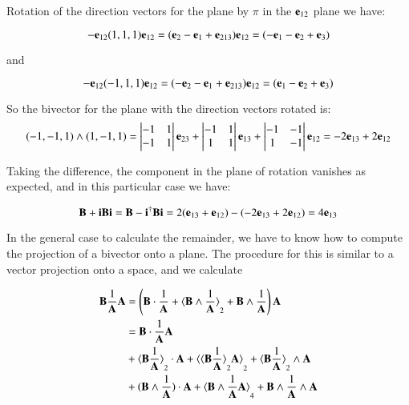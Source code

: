 \documentclass{article}      %
\begin{document}
Rotation of the direction vectors for the plane by $\pi$ in the $\mathbf{e}_{12}$ plane we have:

\[
-\mathbf{e}_{12}(1,1,1)\mathbf{e}_{12}= 
(\mathbf{e}_{2}
-\mathbf{e}_{1}
+\mathbf{e}_{213})\mathbf{e}_{12}
= (-\mathbf{e}_{1} -\mathbf{e}_{2} + \mathbf{e}_{3})
\]

and

\[
-\mathbf{e}_{12}(-1,1,1)\mathbf{e}_{12}= 
(-\mathbf{e}_{2}
-\mathbf{e}_{1}
+\mathbf{e}_{213})\mathbf{e}_{12}
= (\mathbf{e}_{1} -\mathbf{e}_{2} + \mathbf{e}_{3})
\]

So the bivector for the plane with the direction vectors rotated is:
\[
(-1,-1,1)\wedge(1,-1,1) = 
\begin{vmatrix}
 -1 & 1 \\
 -1 & 1 \\
\end{vmatrix}
\mathbf{e}_{23}
+
\begin{vmatrix}
 -1 & 1 \\
 1 & 1 \\
\end{vmatrix}
\mathbf{e}_{13}
+
\begin{vmatrix}
 -1 & -1 \\
 1 & -1 \\
\end{vmatrix}
\mathbf{e}_{12}
=
-2\mathbf{e}_{13} + 2\mathbf{e}_{12}
\]

Taking the difference, the component in the plane of rotation vanishes as expected, and in this particular case we have:

\[
\mathbf{B} + \mathbf{i}\mathbf{B}\mathbf{i} = \mathbf{B} - \mathbf{i}^\dagger\mathbf{B}\mathbf{i} = 
2(\mathbf{e}_{13} + \mathbf{e}_{12}) -(-2\mathbf{e}_{13} + 2\mathbf{e}_{12}) = 4\mathbf{e}_{13}
\]

In the general case to calculate the remainder, we have to know how to compute the projection of a bivector onto a plane.  The procedure for this is similar to a vector
projection onto a space, and we calculate

\begin{align*}
\mathbf{B}\frac{1}{\mathbf{A}}\mathbf{A} 
&= \left(\mathbf{B} \cdot \frac{1}{\mathbf{A}} +{\langle{\mathbf{B}\wedge \frac{1}{\mathbf{A}}}\rangle}_2 +\mathbf{B} \wedge \frac{1}{\mathbf{A}}\right) \mathbf{A} \\
&= 
\mathbf{B} \cdot \frac{1}{\mathbf{A}} \mathbf{A} \\
&+{\langle{ {\mathbf{B}\frac{1}{\mathbf{A}}}\rangle}_2} \cdot \mathbf{A} 
+{\langle{{\langle{ {\mathbf{B}\frac{1}{\mathbf{A}}}\rangle}_2} \mathbf{A}}\rangle}_2 
+{\langle{ {\mathbf{B}\frac{1}{\mathbf{A}}}\rangle}_2} \wedge \mathbf{A}  \\
&+(\mathbf{B} \wedge \frac{1}{\mathbf{A}}) \cdot \mathbf{A} 
+{\langle{\mathbf{B}\wedge \frac{1}{\mathbf{A}} \mathbf{A}}\rangle}_4 
+\mathbf{B} \wedge \frac{1}{\mathbf{A}} \wedge \mathbf{A} \\
\end{align*}
\end{document}
